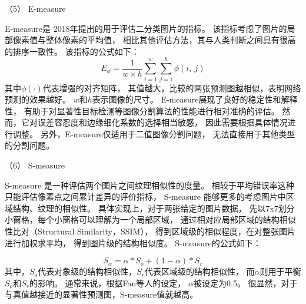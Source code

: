 




（5）
E-measure






E-measure是
2018年提出的用于评估二分类图片的指标。
该指标考虑了图片的局部像素值与整体像素的平均值，
相比其他评估方法，其与人类判断之间具有很高的排序一致性。
该指标的公式如下：
%
%
\begin{equation}
	E_{\phi } = \frac{1}{w \times h} \sum_{i=1}^{w} \sum_{j=1}^{h} \phi\left ( i,~j \right ) 
\end{equation}
%
%
%
%
其中$\phi\left (\cdot \right ) $代表增强的对齐矩阵，
其值越大，比较的两张预测图越相似，表明网络预测的效果越好。
$w$和$h$表示图像的尺寸。
E-measure展现了良好的稳定性和解释性，
有助于对显著性目标检测等图像分割算法的性能进行相对准确的评估。
然而，它对误差容忍度和边缘细化系数的选择相当敏感，
因此需要根据具体情况进行调整。
另外，E-measure仅适用于二值图像分割问题，
无法直接用于其他类型的分割问题。




（6）
S-measure


S-measure 是一种评估两个图片之间纹理相似性的度量。
相较于平均错误率这种只能评估像素点之间累计差异的评价指标，
S-measure 能够更多的考虑图片中区域结构、纹理的相似性。
具体实现上，对于两张给定的图片数据，
先以7x7划分小窗格，每个小窗格可以理解为一个局部区域，
通过相对应局部区域的结构相似性比对（Structural Similarity，SSIM），
得到区域级的相似程度，在对整张图片进行加权求平均，
得到图片级的结构相似度。
S-measure的公式如下：



\begin{equation}
	S_{\alpha} = \alpha * S_{o} + \left ( 1 - \alpha  \right )*S_{r} 
\end{equation}
%
%
其中，$S_{o}$代表对象级的结构相似性，$S_{r}$代表区域级的结构相似性，
而$\alpha$则用于平衡$S_{o}$和$S_{r}$的影响。
通常来说，根据Fan等人的设定，
$\alpha$被设定为0.5。
很显然，对于与真值越接近的显著性预测图，S-measure值就越高。



